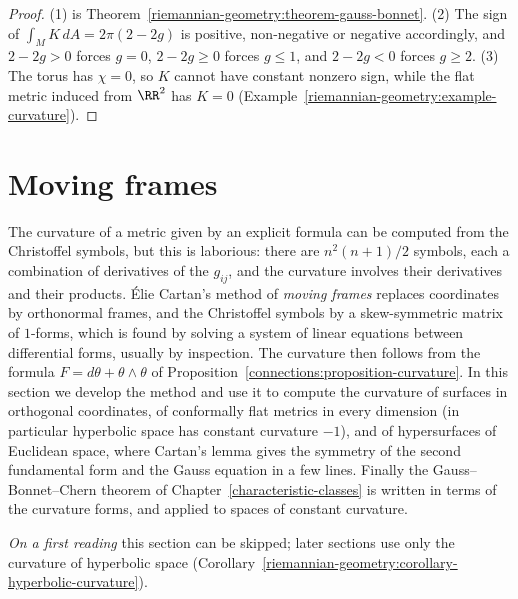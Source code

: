 \begin{proof}
(1) is Theorem~\ref{riemannian-geometry:theorem-gauss-bonnet}. (2) The sign of $\int_MK\,dA = 2\pi(2 - 2g)$ is positive, non-negative or negative accordingly, and $2 - 2g > 0$ forces $g = 0$, $2 - 2g \geq 0$ forces
$g \leq 1$, and $2 - 2g < 0$ forces $g \geq 2$. (3) The torus has $\chi = 0$, so $K$ cannot have constant nonzero sign, while the flat metric induced from $\RR^2$ has $K = 0$ (Example~\ref{riemannian-geometry:example-curvature}).
\end{proof}

\section{Moving frames}\label{riemannian-geometry:section-moving-frames}

The curvature of a metric given by an explicit formula can be computed from the Christoffel symbols, but this is laborious: there are $n^2(n+1)/2$ symbols, each a combination of
derivatives of the $g_{ij}$, and the curvature involves their derivatives and their products. \'Elie Cartan's method of \emph{moving frames} replaces coordinates by orthonormal frames,
and the Christoffel symbols by a skew-symmetric matrix of $1$-forms, which is found by solving a system of linear equations between differential forms, usually by inspection. The
curvature then follows from the formula $F = d\theta + \theta \wedge \theta$ of Proposition~\ref{connections:proposition-curvature}. In this section we develop the method and use it to
compute the curvature of surfaces in orthogonal coordinates, of conformally flat metrics in every dimension (in particular hyperbolic space has constant curvature $-1$), and of
hypersurfaces of Euclidean space, where Cartan's lemma gives the symmetry of the second fundamental form and the Gauss equation in a few lines. Finally the Gauss--Bonnet--Chern
theorem of Chapter~\ref{characteristic-classes} is written in terms of the curvature forms, and applied to spaces of constant curvature.

\emph{On a first reading} this section can be skipped; later sections use only the curvature of hyperbolic space
(Corollary~\ref{riemannian-geometry:corollary-hyperbolic-curvature}).

